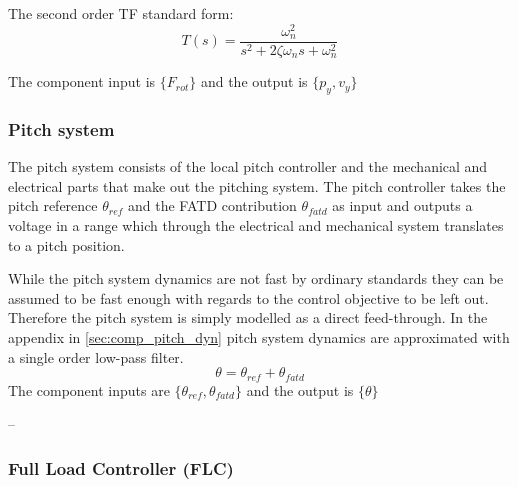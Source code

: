 \medskip
The second order TF standard form:
\begin{equation}\label{eq:std_tf}
	T(s) = \dfrac{\omega_n^2}{s^2 + 2 \zeta \omega_n s + \omega_n^2}
\end{equation}

The component input is $ \{F_{rot} \} $ and the output is $ \{p_y, v_y\} $

%
%
%

\subsubsection{Pitch system} \label{sec:comp_pitch}
The pitch system consists of the local pitch controller and the mechanical and electrical parts that make out the pitching system. The pitch controller takes the pitch reference $ \theta_{ref} $ and the FATD contribution $ \theta_{fatd} $ as input and outputs a voltage in a range which through the electrical and mechanical system translates to a pitch position. 

While the pitch system dynamics are not fast by ordinary standards they can be assumed to be fast enough with regards to the control objective to be left out. Therefore the pitch system is simply modelled as a direct feed-through. In the appendix in \cref{sec:comp_pitch_dyn} pitch system dynamics are approximated with a single order low-pass filter. 
\begin{equation}\label{eq:comp_pitch_freq}
	\theta = \theta_{ref} + \theta_{fatd}
\end{equation}
The component inputs are $ \{\theta_{ref}, \theta_{fatd}  \} $ and the output is $ \{\theta \} $


--\subsubsection{Full Load Controller (FLC)} \label{sec:comp_flc}


